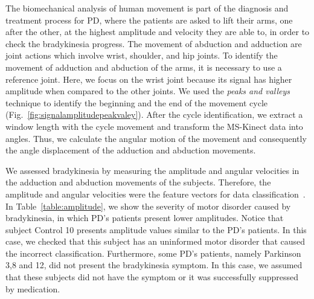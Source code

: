 The biomechanical analysis of human movement is part of the diagnosis and treatment process for PD, where the patients are asked to lift their arms, one after the other, at the highest amplitude and velocity they are able to, in order to check the bradykinesia progress. The movement of abduction and adduction are joint actions which involve wrist, shoulder, and hip joints. To identify the movement of adduction and abduction of the arms, it is necessary to use a reference joint. Here, we focus on the wrist joint because its signal has higher amplitude when compared to the other joints. We used the \textit{peaks and valleys} technique to identify the beginning and the end of the movement cycle (Fig.~\ref{fig:signalamplitudepeakvaley}). After the cycle identification, we extract a window length with the cycle movement and transform the MS-Kinect data into angles. Thus, we calculate the angular motion of the movement and consequently the angle displacement of the adduction and abduction movements.


We assessed bradykinesia by measuring the amplitude and angular velocities in the adduction and abduction movements of the subjects. Therefore, the amplitude and angular velocities were the feature vectors for data classification~\cite{kantardzic2011data}. In Table~\ref{table:amplitude}, we show the severity of motor disorder caused by bradykinesia, in which PD's patients present lower amplitudes. Notice that subject Control 10 presents amplitude values similar to the PD's patients. In this case, we checked that this subject has an uninformed motor disorder that caused the incorrect classification. Furthermore, some PD's patients, namely Parkinson 3,8 and 12, did not present the bradykinesia symptom. In this case, we assumed that these subjects did not have the symptom or it was successfully suppressed by medication. 


